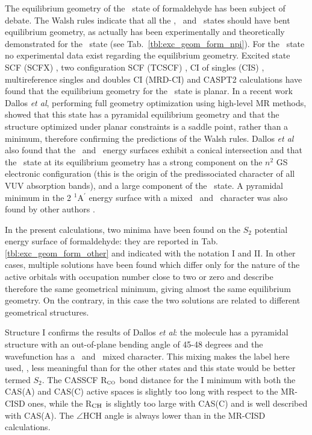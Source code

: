 The equilibrium geometry of the \spipi\ state of formaldehyde has been
subject of debate. The Walsh rules \cite{jcs-1953-2306-1953} indicate that
all the \npi, \pipi\  and \spi\  states should have bent equilibrium geometry,
as actually has been experimentally and theoretically demonstrated for the
\npi\ state (see Tab.~\ref{tbl:exc_geom_form_npi}).  For the \pipi\ state
no experimental data exist regarding the equilibrium geometry.  Excited
state SCF (SCFX) \cite{jcp-87-7076-1987}, two configuration SCF (TCSCF)
\cite{jcp-87-7076-1987}, CI of singles (CIS)
\cite{jpc-96-135-1992,jpc-97-4293-1993}, multireference singles and doubles
CI (MRD-CI) \cite{jpc-99-8050-1995,cpl-256-179-1996} and CASPT2
\cite{tca-92-227-1995} calculations have found that the equilibrium geometry
for the \spipi\ state is planar.  In a recent work \cite{jcp-114-746-2001}
Dallos {\it et al}, performing full geometry optimization using high-level
MR methods, showed that this state has a pyramidal equilibrium geometry and that
the structure optimized under planar constraints is a saddle point, rather
than a minimum, therefore confirming the predictions of the Walsh rules. 
Dallos {\it et al} also found that the \spipi\ and \sspi\ energy
surfaces exhibit a conical intersection and that the \spipi\ state at its
equilibrium geometry has a strong component on the $n^2$ GS electronic
configuration (this is the origin of the predissociated character of all VUV
absorption bands), and a large component of the \sspi\ state.  A pyramidal
minimum in the 2 $^1$A$^\prime$  energy surface with a mixed \pipi\ and
\spi\ character was also found by other authors
\cite{jpc-99-8050-1995,tca-92-227-1995}.

In the present calculations, two minima have been found on the $S_2$
potential energy surface of formaldehyde: they are reported
in Tab. \ref{tbl:exc_geom_form_other} and indicated with the notation I and
II.  In other cases, multiple solutions have been found which differ only
for the nature of the active orbitals with occupation number close to two or
zero and describe therefore the same geometrical minimum, giving almost the
same equilibrium geometry.  On the contrary, in this case the two solutions
are related to different geometrical structures. 

Structure I confirms the results of Dallos {\it et al}: the molecule has a
pyramidal structure with an out-of-plane bending angle of 45-48 degrees
and the wavefunction has a \pipi\ and \spi\ mixed character. This mixing
makes the label here used, \pipi, less meaningful than for the other states
and this state would be better termed $S_2$.  The CASSCF R$_{\mbox{\tiny CO}}$ bond
distance for the I minimum with both the CAS(A) and CAS(C) active spaces is
slightly too long with respect to the MR-CISD \cite{jcp-114-746-2001} ones,
while the R$_{\rm CH}$ is slightly too large with CAS(C) and is well
described with CAS(A).  The $\angle$HCH angle is always lower  than in the
MR-CISD calculations.

